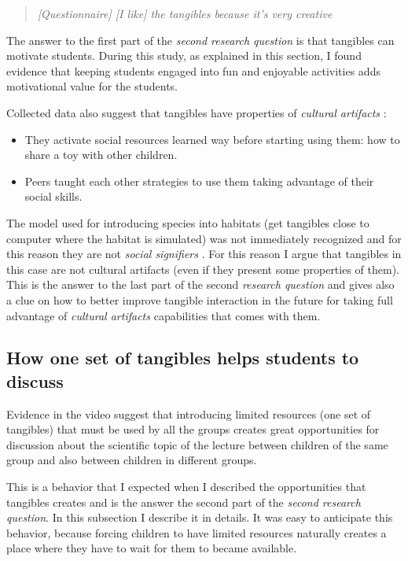 \begin{quote}
\textit{[Questionnaire]
[I like] the tangibles because it's very creative}
\end{quote}

The answer to the first part of the \textit{second research question} is that tangibles can motivate students. During this study, as explained in this section, I found evidence that keeping students engaged into fun and enjoyable activities adds motivational value for the students. 

Collected data also suggest that tangibles have properties of \textit{cultural artifacts} \cite{horn:role}:
\begin{itemize}
\item They activate social resources learned way before starting using them: how to share a toy with other children.
\item Peers taught each other strategies to use them taking advantage of their social skills.
\end{itemize}
The model used for introducing species into habitats (get tangibles close to computer where the habitat is simulated) was not immediately recognized and for this reason they are not \textit{social signifiers} \cite{norman:way}. For this reason I argue that tangibles in this case are not cultural artifacts (even if they present some properties of them). This is the answer to the last part of the second \textit{research question} and gives also a clue on how to better improve tangible interaction in the future for taking full advantage of \textit{cultural artifacts} \cite{horn:role} capabilities that comes with them. 

\subsection{How one set of tangibles helps students to discuss}
Evidence in the video suggest that introducing limited resources (one set of tangibles) that must be used by all the groups creates great opportunities for discussion about the scientific topic of the lecture between children of the same group and also between children in different groups.

This is a behavior that I expected when I described the opportunities that tangibles creates and is the answer the second part of the \textit{second research question}. In this subsection I describe it in details. It was easy to anticipate this behavior, because forcing children to have limited resources naturally creates a place where they have to wait for them to became available.

